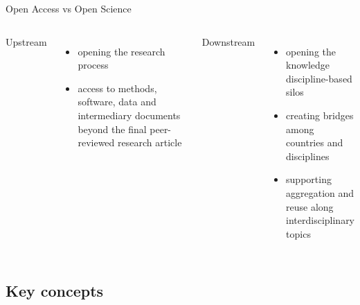 \documentclass[xcolor=svgnames]{beamer}
\begin{document}
        \begin{frame}{Open Access vs Open Science}
            \vspace{0.05\textheight}
            \begin{columns}[c]
                    Upstream
                    \begin{itemize}
                        \item<2-> opening the research process
                        \item<3-> access to methods, software, data and intermediary documents beyond the final peer-reviewed research article
                    \end{itemize}
                    Downstream
                    \begin{itemize}
                        \item<4-> opening the knowledge discipline-based silos
                        \item<5-> creating bridges among countries and disciplines
                        \item<6-> supporting aggregation and reuse along interdisciplinary topics
                    \end{itemize}
            \end{columns}
        \end{frame}

    \subsection{Key concepts}
\end{document}
